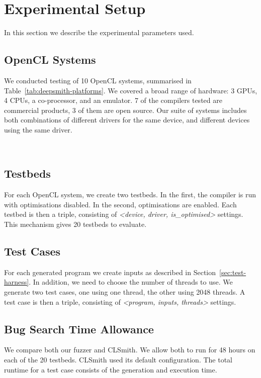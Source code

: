 \section{Experimental Setup}

In this section we describe the experimental parameters used.

\subsection{OpenCL Systems}

We conducted testing of 10 OpenCL systems, summarised in
Table~\ref{tab:deepsmith-platforms}. We covered a broad range of hardware: 3 GPUs, 4
CPUs, a co-processor, and an emulator. 7 of the compilers tested are commercial
products, 3 of them are open source. Our suite of systems includes both
combinations of different drivers for the same device, and different devices
using the same driver.

\begin{table}
	\centering %
	\subfloat{}\\ %
  \subfloat{} %
	\caption[OpenCL systems and the number of bug reports submitted to date]{%
		OpenCL systems and the number of bug reports submitted to date (22\% of which have been fixed, the remainder are pending). For each system, two testbeds are created, one with compiler optimisations, the other without.%
	}
	\label{tab:deepsmith-platforms}
\end{table}

\subsection{Testbeds}

For each OpenCL system, we create two testbeds. In the first, the compiler is
run with optimisations disabled. In the second, optimisations are enabled. Each
testbed is then a triple, consisting of \emph{<device, driver, is\_optimised>}
settings. This mechanism gives 20 testbeds to evaluate.


\subsection{Test Cases}

For each generated program we create inputs as described in
Section~\ref{sec:test-harness}. In addition, we need to choose the number of
threads to use. We generate two test cases, one using one thread, the other
using 2048 threads. A test case is then a triple, consisting of \emph{<program,
inputs, threads>} settings.

\subsection{Bug Search Time Allowance}

We compare both our fuzzer and CLSmith. We allow both to run for 48 hours on
each of the 20 testbeds. CLSmith used its default configuration. The total
runtime for a test case consists of the generation and execution time.
